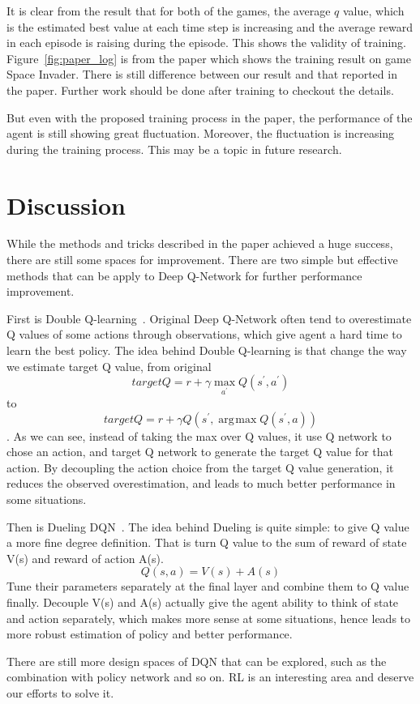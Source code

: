 \documentclass[10pt,twocolumn,letterpaper]{article}
\DeclareMathOperator{\argmax}{\arg\!\max}
\begin{document}
\begin{CJK}{UTF8}{gbsn}
It is clear from the result that for both of the games, the average $q$ value, which is the estimated best value at each time step is increasing and the average reward in each episode is raising during the episode. This shows the validity of training. Figure~\ref{fig:paper_log} is from the paper which shows the training result on game Space Invader. There is still difference between our result and that reported in the paper. Further work should be done after training to checkout the details.

But even with the proposed training process in the paper, the performance of the agent is still showing great fluctuation. Moreover, the fluctuation is increasing during the training process. This may be a topic in future research.

\section{Discussion}

While the methods and tricks described in the paper achieved a huge success, there are still some spaces for improvement. There are two simple but effective methods that can be apply to Deep Q-Network for further performance improvement. 

First is Double Q-learning~\cite{van2015deep}. Original Deep Q-Network often tend to overestimate Q values of some actions through observations, which give agent a hard time to learn the best policy. The idea behind Double Q-learning is that change the way we estimate target Q value, from original  
\[
    target Q = r+\gamma \max\limits_{a^\prime} Q(s^\prime, a^\prime)
\]
to
\[
    target Q = r+\gamma Q(s^\prime, \argmax Q(s^\prime, a) )
\].
As we can see, instead of taking the max over Q values, it use Q network to chose an action, and target Q network to generate the target Q value for that action. By decoupling the action choice from the target Q value generation, it reduces the observed overestimation, and leads to much better performance in some situations.

Then is Dueling DQN~\cite{wang2015dueling}. The idea behind Dueling is quite simple: to give Q value a more fine degree definition. That is turn Q value to the sum of reward of state V(s) and reward of action A(s).
\[
    Q(s,a) = V(s) + A(s)
\]
Tune their parameters separately at the final layer and combine them to Q value finally. Decouple V(s) and A(s) actually give the agent ability to think of state and action separately, which makes more sense at some situations, hence leads to more robust estimation of policy and better performance. 

There are still more design spaces of DQN that can be explored, such as the combination with policy network and so on. RL is an interesting area and deserve our efforts to solve it. 

{\small


}

\end{CJK}
\end{document}
